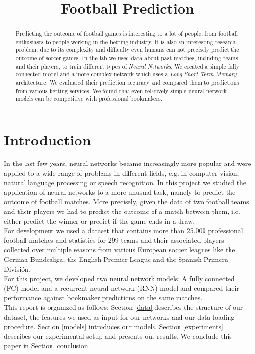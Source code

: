 \documentclass[a4paper]{article}
\title{Football Prediction}
\begin{document}
\maketitle
%
\begin{abstract}
Predicting the outcome of football games is interesting to a lot of people, from
football enthusiasts to people working in the betting industry. It is also an
interesting research problem, due to its complexity and difficulty even
humans can not precisely predict the outcome of soccer games. In the lab
we used data about past matches, including teams and their players, to train
different types of \textit{Neural Networks}. We created a simple fully connected model and
a more complex network which uses a \textit{Long-Short-Term Memory} architecture. We evaluated their prediction accuracy and compared them to predictions from various betting services. We found that even relatively simple neural network models can be competitive with professional bookmakers.
\end{abstract}
%
\section{Introduction}
In the last few years, neural networks became increasingly more popular and were
applied to a wide range of problems in different fields, e.g. in computer
vision, natural language processing or speech recognition. In this project we
studied the application of neural networks to a more unusual task, namely to
predict the outcome of football matches. More precisely, given the data of two
football teams and their players we had to predict the outcome of a match between them, i.e.
either predict the winner or predict if the game ends in a draw. \\
For development we used a dataset that 
contains more than 25.000 professional football matches and statistics for 299
teams and their associated players collected over multiple seasons from various
European soccer leagues like the German Bundesliga, the English Premier League
and the Spanish Primera División. \\
For this project, we developed two neural network models: A fully connected (FC) model
and a recurrent neural network (RNN) model and compared their performance against
bookmaker predictions on the same matches. \\
This report is organized as follows: Section \ref{data} describes the structure
of our dataset, the features we used as input for our networks and our data
loading procedure. Section \ref{models} introduces our  models. Section \ref{experiments} describes our experimental setup
and presents our results. We conclude this paper in Section \ref{conclusion}.
\end{document}
